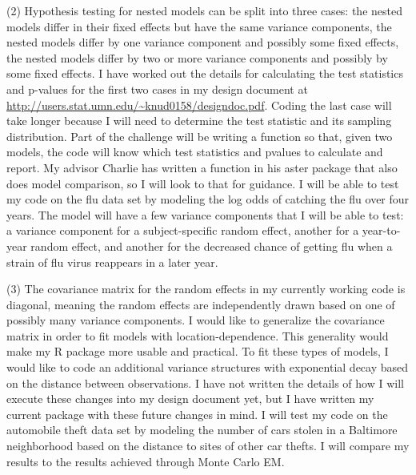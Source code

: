 \documentclass[12pt]{article}
\begin{document}
(2)  Hypothesis testing for nested models can be split into three cases: the nested models differ in their fixed effects but have the same variance components, the nested models differ by one variance component and possibly some fixed effects, the nested models differ by two or more variance components and possibly by some fixed effects. I have worked out the details for calculating the test statistics and p-values for the first two cases in my design document at \url{http://users.stat.umn.edu/~knud0158/designdoc.pdf}. Coding the last case will take longer because I will need to determine the test statistic and its sampling distribution. Part of the challenge will be writing a function so that, given two models, the code will know which test statistics and pvalues to calculate and report. My advisor Charlie has written a function in his aster package that also does model comparison, so I will look to that for guidance.  I will be able to test my code on the \citet{coull:agresti:2000} flu data set by modeling the log odds of catching the flu over four years. The model will have a few variance components that I will be able to test: a variance component for a subject-specific random effect, another for a year-to-year random effect, and another for the decreased chance of getting flu when a  strain of flu virus reappears in a later year.

(3) The covariance matrix for the random effects in my currently working code is diagonal, meaning the random effects are independently drawn based on one of possibly many variance components.  I would like to generalize the covariance matrix in order to fit models with location-dependence.  This generality would make my R package more usable and practical.  To fit these types of models, I would like to code an additional variance structures with  exponential decay based on the distance between observations. I have not written the details of how I will execute these changes into my design document yet, but I have written my current package with these future changes in mind. I will test my code on the \citet{caffojj:2005} automobile theft data set by modeling the number of cars stolen in a Baltimore neighborhood based on the distance to sites of other car thefts.  I will compare my results to the results achieved through Monte Carlo EM. 
\end{document}
